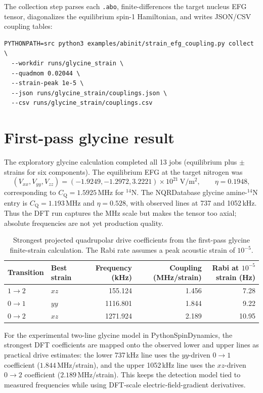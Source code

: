 \documentclass[11pt,oneside]{report}
\newcommand{\code}[1]{{\small\nolinkurl{#1}}}
\newcommand{\Cq}{C_{\mathrm{Q}}}
\begin{document}
The collection step parses each \code{.abo}, finite-differences the target
nucleus EFG tensor, diagonalizes the equilibrium spin-1 Hamiltonian, and writes
JSON/CSV coupling tables:

\begin{lstlisting}
PYTHONPATH=src python3 examples/abinit/strain_efg_coupling.py collect \
  --workdir runs/glycine_strain \
  --quadmom 0.02044 \
  --strain-peak 1e-5 \
  --json runs/glycine_strain/couplings.json \
  --csv runs/glycine_strain/couplings.csv
\end{lstlisting}

\section{First-pass glycine result}

The exploratory glycine calculation completed all 13 jobs (equilibrium plus
$\pm$ strains for six components).  The equilibrium EFG at the target nitrogen
was
\[
  (V_{xx},V_{yy},V_{zz})
    = (-1.9249,-1.2972,3.2221)\times 10^{21}\ \mathrm{V/m^2},
  \qquad \eta = 0.1948,
\]
corresponding to $\Cq = 1.5925$\,MHz for $^{14}$N.  The NQRDatabase glycine
amine-$^{14}$N entry is $\Cq=1.193$\,MHz and $\eta=0.528$, with observed lines at
737 and 1052\,kHz.  Thus the DFT run captures the MHz scale but makes the tensor
too axial; absolute frequencies are not yet production quality.

\begin{table}[htbp]
\centering
\begin{tabular}{llrrr}
\toprule
Transition & Best strain & Frequency (kHz) & Coupling (MHz/strain) &
Rabi at $10^{-5}$ strain (Hz) \\
\midrule
$1\to2$ & $xz$ & 155.124 & 1.456 & 7.28 \\
$0\to1$ & $yy$ & 1116.801 & 1.844 & 9.22 \\
$0\to2$ & $xz$ & 1271.924 & 2.189 & 10.95 \\
\bottomrule
\end{tabular}
\caption{Strongest projected quadrupolar drive coefficients from the first-pass
glycine finite-strain calculation.  The Rabi rate assumes a peak acoustic strain
of $10^{-5}$.}
\label{tab:glycine-strain-drive}
\end{table}

For the experimental two-line glycine model in PythonSpinDynamics, the strongest
DFT coefficients are mapped onto the observed lower and upper lines as practical
drive estimates: the lower 737\,kHz line uses the $yy$-driven $0\to1$ coefficient
($1.844$\,MHz/strain), and the upper 1052\,kHz line uses the $xz$-driven
$0\to2$ coefficient ($2.189$\,MHz/strain).  This keeps the detection model tied
to measured frequencies while using DFT-scale electric-field-gradient
derivatives.
\end{document}
